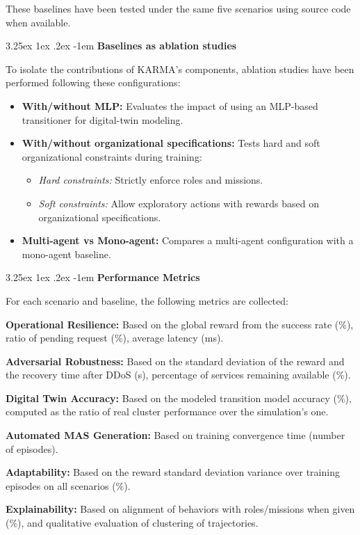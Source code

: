 \documentclass[conference]{IEEEtran}
\makeatletter
\renewcommand\paragraph{\@startsection{paragraph}{5}{\z@}%
  {3.25ex \@plus1ex \@minus.2ex}%
  {-1em}%
  {\normalfont\normalsize\bfseries}}
\makeatother
\begin{document}
These baselines have been tested under the same five scenarios using source code when available.

\paragraph{\textbf{Baselines as ablation studies}}

\noindent To isolate the contributions of KARMA's components, ablation studies have been performed following these configurations:
%
\begin{itemize}
    \item \textbf{With/without MLP:} Evaluates the impact of using an MLP-based transitioner for digital-twin modeling.
    \item \textbf{With/without organizational specifications:} Tests hard and soft organizational constraints during training:
        \begin{itemize}
            \item \textit{Hard constraints:} Strictly enforce roles and missions.
            \item \textit{Soft constraints:} Allow exploratory actions with rewards based on organizational specifications.
        \end{itemize}
    \item \textbf{Multi-agent vs Mono-agent:} Compares a multi-agent configuration with a mono-agent baseline.
\end{itemize}

\paragraph{\textbf{Performance Metrics}}

\noindent For each scenario and baseline, the following metrics are collected:
%
\begin{enumerate*}[label=\textbf{\arabic*)}, itemjoin={;\quad }]
    \item \textbf{Operational Resilience:} Based on the global reward from the success rate (\%), ratio of pending request (\%), average latency (ms).
    \item \textbf{Adversarial Robustness:} Based on the standard deviation of the reward and the recovery time after DDoS (s), percentage of services remaining available (\%).
    \item \textbf{Digital Twin Accuracy:} Based on the modeled transition model accuracy (\%), computed as the ratio of real cluster performance over the simulation's one.
    \item \textbf{Automated MAS Generation:} Based on training convergence time (number of episodes).
    \item \textbf{Adaptability:} Based on the reward standard deviation variance over training episodes on all scenarios (\%).
    \item \textbf{Explainability:} Based on alignment of behaviors with roles/missions when given (\%), and qualitative evaluation of clustering of trajectories.
\end{enumerate*}
\end{document}
